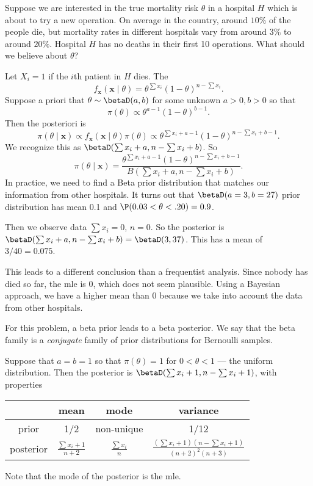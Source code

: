 \documentclass[a4paper]{article}
\begin{document}
\begin{eg}
  Suppose we are interested in the true mortality risk $\theta$ in a hospital $H$ which is about to try a new operation. On average in the country, around $10\%$ of the people die, but mortality rates in different hospitals vary from around $3\%$ to around $20\%$. Hospital $H$ has no deaths in their first 10 operations. What should we believe about $\theta$?

  Let $X_i = 1$ if the $i$th patient in $H$ dies. The
  \[
    f_{\mathbf{x}}(\mathbf{x}\mid \theta) = \theta^{\sum x_i}(1 - \theta)^{n - \sum x_i}.
  \]
  Suppose a priori that $\theta\sim \betaD(a, b)$ for some unknown $a > 0, b > 0$ so that
  \[
    \pi(\theta)\propto \theta^{a - 1}(1 - \theta)^{b - 1}.
  \]
  Then the posteriori is
  \[
    \pi(\theta\mid \mathbf{x})\propto f_{\mathbf{x}}(\mathbf{x}\mid \theta)\pi(\theta)\propto \theta^{\sum x_i + a - 1}(1 - \theta)^{n- \sum x_i + b - 1}.
  \]
  We recognize this as $\betaD(\sum x_i + a, n - \sum x_i + b)$. So
  \[
    \pi(\theta\mid \mathbf{x}) = \frac{\theta^{\sum x_i + a - 1}(1 - \theta)^{n - \sum x_i + b - 1}}{B(\sum x_i + a, n - \sum x_i + b)}.
  \]
  In practice, we need to find a Beta prior distribution that matches our information from other hospitals. It turns out that $\betaD(a = 3, b = 27)$ prior distribution has mean 0.1 and $\P(0.03 < \theta < .20) = 0.9$.

  Then we observe data $\sum x_i = 0$, $n = 0$. So the posterior is $\betaD(\sum x_i + a, n - \sum x_i + b) = \betaD(3, 37)$. This has a mean of $3/40 = 0.075$.

  This leads to a different conclusion than a frequentist analysis. Since nobody has died so far, the mle is $0$, which does not seem plausible. Using a Bayesian approach, we have a higher mean than $0$ because we take into account the data from other hospitals.
\end{eg}

For this problem, a beta prior leads to a beta posterior. We say that the beta family is a \emph{conjugate} family of prior distributions for Bernoulli samples.

Suppose that $a = b = 1$ so that $\pi (\theta) = 1$ for $0 < \theta < 1$ --- the uniform distribution. Then the posterior is $\betaD(\sum x_i + 1, n - \sum x_i + 1)$, with properties
\begin{center}
  \begin{tabular}{cccc}
    \toprule
    &mean & mode & variance\\
    \midrule
    prior & 1/2 & non-unique & 1/12\\
    posterior & $\displaystyle \frac{\sum x_i + 1}{n + 2}$ & $\displaystyle \frac{\sum x_i}{n}$ & $\displaystyle\frac{(\sum x_i + 1)(n - \sum x_i + 1)}{(n + 2)^2(n + 3)}$\\
    \bottomrule
  \end{tabular}
\end{center}
Note that the mode of the posterior is the mle.
\end{document}
